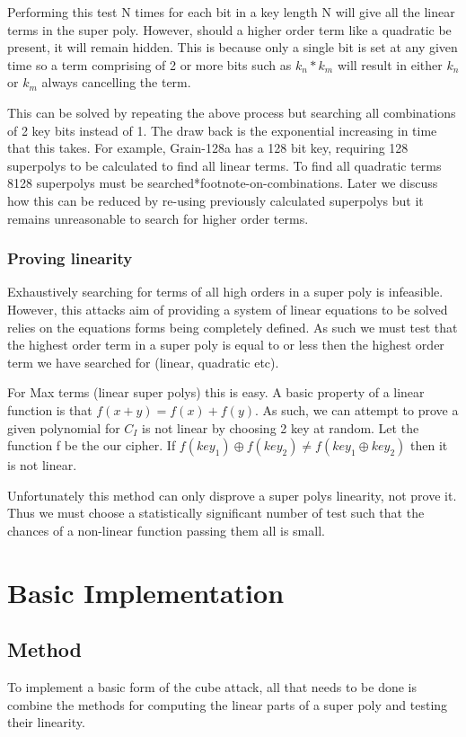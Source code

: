 \documentclass{report}
\let\Oldsection\section
\renewcommand{\section}{\FloatBarrier\Oldsection}
\let\Oldsubsection\subsection
\renewcommand{\subsection}{\FloatBarrier\Oldsubsection}
\let\Oldsubsubsection\subsubsection
\renewcommand{\subsubsection}{\FloatBarrier\Oldsubsubsection}
\begin{document}
Performing this test N times for each bit in a key length N will give all the linear terms in the super poly. However, should a higher order term like a quadratic be present, it will remain hidden. This is because only a single bit is set at any given time so a term comprising of 2 or more bits such as $k_n*k_m$ will result in either $k_n$ or $k_m$ always cancelling the term.

This can be solved by repeating the above process but searching all combinations of 2 key bits instead of 1. The draw back is the exponential increasing in time that this takes. For example, Grain-128a has a 128 bit key, requiring 128 superpolys to be calculated to find all linear terms. To find all quadratic terms 8128 superpolys must be searched*footnote-on-combinations. Later we discuss how this can be reduced by re-using previously calculated superpolys but it remains unreasonable to search for higher order terms.
\subsubsection{Proving linearity}
Exhaustively searching for terms of all high orders in a super poly is infeasible. However, this attacks aim of providing a system of linear equations to be solved relies on the equations forms being completely defined. As such we must test that the highest order term in a super poly is equal to or less then the highest order term we have searched for (linear, quadratic etc).

For Max terms (linear super polys) this is easy. A basic property of a linear function is that $f(x+y)=f(x)+f(y)$.%
As such, we can attempt to prove a given polynomial for $C_I$ is not linear by choosing 2 key at random. Let the function f be the our cipher. If $f(key_1)\oplus f(key_2) \neq f(key_1 \oplus key_2)$ then it is not linear.

Unfortunately this method can only disprove a super polys linearity, not prove it. Thus we must choose a statistically significant number of test such that the chances of a non-linear function passing them all is small.%

\section{Basic Implementation}
\subsection{Method}
To implement a basic form of the cube attack, all that needs to be done is combine the methods for computing the linear parts of a super poly and testing their linearity.
\end{document}
